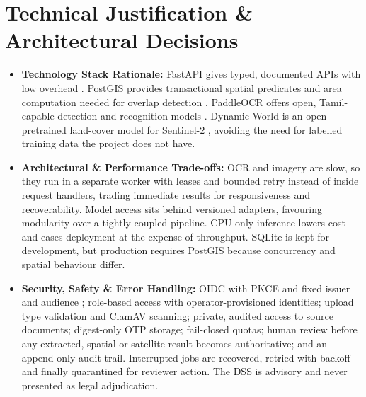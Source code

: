 \documentclass[11pt, a4paper]{article}
\begin{document}
\section{Technical Justification \& Architectural Decisions}
\begin{itemize}[noitemsep, topsep=2pt]
    \item \textbf{Technology Stack Rationale:} FastAPI gives typed, documented APIs with low overhead \cite{fastapi}. PostGIS provides transactional spatial predicates and area computation needed for overlap detection \cite{postgis}. PaddleOCR offers open, Tamil-capable detection and recognition models \cite{du2020ppocr}. Dynamic World is an open pretrained land-cover model for Sentinel-2 \cite{brown2022dynamic}, avoiding the need for labelled training data the project does not have.
    \item \textbf{Architectural \& Performance Trade-offs:} OCR and imagery are slow, so they run in a separate worker with leases and bounded retry instead of inside request handlers, trading immediate results for responsiveness and recoverability. Model access sits behind versioned adapters, favouring modularity over a tightly coupled pipeline. CPU-only inference lowers cost and eases deployment at the expense of throughput. SQLite is kept for development, but production requires PostGIS because concurrency and spatial behaviour differ.
    \item \textbf{Security, Safety \& Error Handling:} OIDC with PKCE and fixed issuer and audience \cite{rfc7636,oidccore}; role-based access with operator-provisioned identities; upload type validation and ClamAV scanning; private, audited access to source documents; digest-only OTP storage; fail-closed quotas; human review before any extracted, spatial or satellite result becomes authoritative; and an append-only audit trail. Interrupted jobs are recovered, retried with backoff and finally quarantined for reviewer action. The DSS is advisory and never presented as legal adjudication.
\end{itemize}

\end{document}
